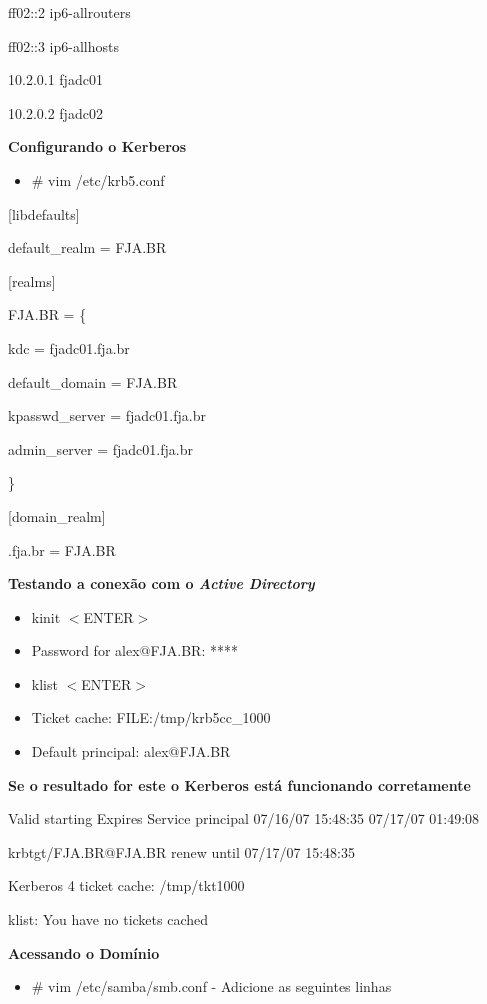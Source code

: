 ff02::2 ip6-allrouters

ff02::3 ip6-allhosts

10.2.0.1   fjadc01

10.2.0.2   fjadc02

\textbf{Configurando o Kerberos}

\begin{itemize}
	\item {\# vim /etc/krb5.conf}
\end{itemize}

[libdefaults]

	default\_realm = FJA.BR

[realms]

    FJA.BR = \{

      kdc = fjadc01.fja.br

      default\_domain = FJA.BR

      kpasswd\_server = fjadc01.fja.br

      admin\_server = fjadc01.fja.br

     \}

[domain\_realm]

.fja.br = FJA.BR

\textbf {Testando a conexão com o \textit{Active Directory}}

\begin{itemize}
	\item {kinit $<$ENTER$>$}
	\item {Password for alex$@$FJA.BR: ****}
	\item {klist $<$ENTER$>$}
	\item {Ticket cache: FILE:/tmp/krb5cc\_1000}
	\item {Default principal: alex$@$FJA.BR}
\end{itemize}

\textbf {Se o resultado for este o Kerberos está funcionando corretamente}

	Valid starting Expires Service principal 07/16/07 15:48:35  07/17/07 01:49:08  

	krbtgt/FJA.BR@FJA.BR renew until 07/17/07 15:48:35
	
	Kerberos 4 ticket cache: /tmp/tkt1000
	
	klist: You have no tickets cached

\textbf{Acessando o Domínio}

\begin{itemize}
	\item {\# vim /etc/samba/smb.conf} -  Adicione as seguintes linhas
\end{itemize}

